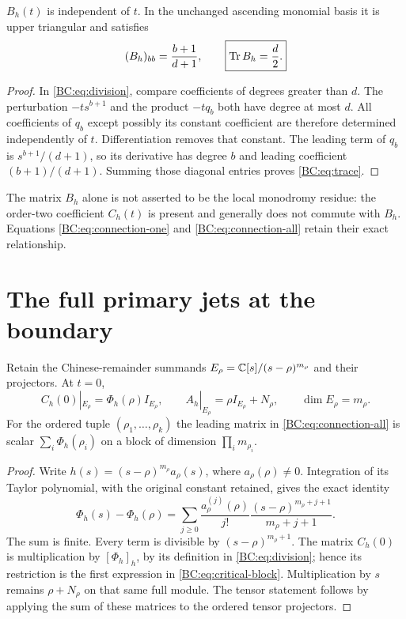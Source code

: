\begin{proposition}
$B_h(t)$ is independent of $t$.  In the unchanged ascending monomial
basis it is upper triangular and satisfies
\begin{equation}
 (B_h)_{bb}=\frac{b+1}{d+1},\qquad
 \boxed{\operatorname{Tr} B_h=\frac d2.}
 \label{BC:eq:trace}
\end{equation}
\end{proposition}
\begin{proof}
In \eqref{BC:eq:division}, compare coefficients of degrees greater than
$d$.  The perturbation $-ts^{b+1}$ and the product $-tq_b$ both have
degree at most $d$.  All coefficients of $q_b$ except possibly its
constant coefficient are therefore determined independently of $t$.
Differentiation removes that constant.  The leading term of $q_b$ is
$s^{b+1}/(d+1)$, so its derivative has degree $b$ and leading coefficient
$(b+1)/(d+1)$.  Summing those diagonal entries proves
\eqref{BC:eq:trace}.
\end{proof}

The matrix $B_h$ alone is not asserted to be the local monodromy
residue: the order-two coefficient $C_h(t)$ is present and generally
does not commute with $B_h$.  Equations \eqref{BC:eq:connection-one} and
\eqref{BC:eq:connection-all} retain their exact relationship.

\section{The full primary jets at the boundary}

\begin{proposition}
Retain the Chinese-remainder summands
$E_\rho=\mathbb C[s]/(s-\rho)^{m_\rho}$ and their projectors.  At $t=0$,
\begin{equation}
 C_h(0)|_{E_\rho}=\Phi_h(\rho)I_{E_\rho},\qquad
 A_h|_{E_\rho}=\rho I_{E_\rho}+N_\rho,\qquad
 \dim E_\rho=m_\rho.
 \label{BC:eq:critical-block}
\end{equation}
For the ordered tuple $(\rho_1,\ldots,\rho_k)$ the leading matrix in
\eqref{BC:eq:connection-all} is scalar
$\sum_i\Phi_h(\rho_i)$ on a block of dimension
$\prod_i m_{\rho_i}$.
\end{proposition}
\begin{proof}
Write $h(s)=(s-\rho)^{m_\rho}a_\rho(s)$, where
$a_\rho(\rho)\ne0$.  Integration of its Taylor polynomial, with the
original constant retained, gives the exact identity
\begin{equation}
 \Phi_h(s)-\Phi_h(\rho)=
 \sum_{j\ge0}\frac{a_\rho^{(j)}(\rho)}{j!}
       \frac{(s-\rho)^{m_\rho+j+1}}{m_\rho+j+1}.
 \label{BC:eq:full-taylor}
\end{equation}
The sum is finite.  Every term is divisible by
$(s-\rho)^{m_\rho+1}$.  The matrix $C_h(0)$ is multiplication by
$[\Phi_h]_h$, by its definition in \eqref{BC:eq:division}; hence its
restriction is the first expression in \eqref{BC:eq:critical-block}.
Multiplication by $s$ remains $\rho+N_\rho$ on that same full module.
The tensor statement follows by applying the sum of these matrices
to the ordered tensor projectors.
\end{proof}

